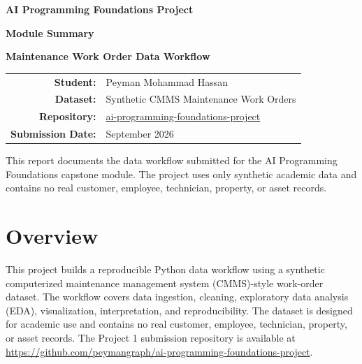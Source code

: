 \documentclass[12pt]{article}
\begin{document}
\begin{titlepage}
\thispagestyle{empty}
\centering
\vspace*{1.2in}

{\Large\bfseries AI Programming Foundations Project\par}
\vspace{0.18in}
{\LARGE\bfseries Module Summary\par}
\vspace{0.55in}

{\large\bfseries Maintenance Work Order Data Workflow\par}
\vspace{0.65in}

\begin{tabular}{>{\bfseries}rl}
Student: & Peyman Mohammad Hassan \\
Dataset: & Synthetic CMMS Maintenance Work Orders \\
Repository: & \href{https://github.com/peymangraph/ai-programming-foundations-project}{ai-programming-foundations-project} \\
Submission Date: & September 2026 \\
\end{tabular}

\vfill

\begin{minipage}{0.82\textwidth}
\centering
\small
This report documents the data workflow submitted for the AI Programming Foundations capstone module. The project uses only synthetic academic data and contains no real customer, employee, technician, property, or asset records.
\end{minipage}

\vspace*{0.7in}
\end{titlepage}

\setcounter{page}{1}

\section*{Overview}
This project builds a reproducible Python data workflow using a synthetic computerized maintenance management system (CMMS)-style work-order dataset. The workflow covers data ingestion, cleaning, exploratory data analysis (EDA), visualization, interpretation, and reproducibility. The dataset is designed for academic use and contains no real customer, employee, technician, property, or asset records. The Project 1 submission repository is available at \url{https://github.com/peymangraph/ai-programming-foundations-project}.
\end{document}
